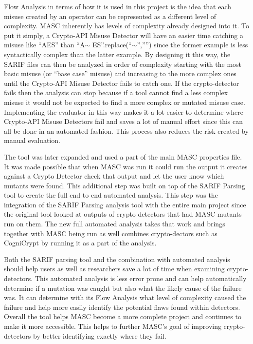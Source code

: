 Flow Analysis in terms of how it is used in this project is the idea that each misuse created by an operator can be represented as a different level of complexity.  MASC inherently has levels of complexity already designed into it. To put it simply, a Crypto-API Misuse Detector will have an easier time catching a misuse like “AES” than “A$\sim$ ES”.replace(“$\sim$”,””) since the former example is less syntactically complex than the latter example. By designing it this way, the SARIF files can then be analyzed in order of complexity starting with the most basic misuse (or “base case” misuse) and increasing to the more complex ones until the Crypto-API Misuse Detector fails to catch one. If the crypto-detector fails then the analysis can stop because if a tool cannot find a less complex misuse it would not be expected to find a more complex or mutated misuse case.  Implementing the evaluator in this way makes it a lot easier to determine where Crypto-API Misuse Detectors fail and saves a lot of manual effort since this can all be done in an automated fashion.  This process also reduces the risk created by manual evaluation. 

The tool was later expanded and used a part of the main MASC properties file. It was made possible that when MASC was run it could run the output it creates against a Crypto Detector check that output and let the user know which mutants were found. This additional step was built on top of the SARIF Parsing tool to create the full end to end automated analysis. This step was the integration of the SARIF Parsing analysis tool with the entire main project since the original tool looked at outputs of crypto detectors that had MASC mutants run on them. The new full automated analysis takes that work and brings together with MASC being run as well combines crypto-dectors such as CogniCrypt by running it as a part of the analysis.

Both the SARIF parsing tool and the combination with automated analysis should help users as well as researchers save a lot of time when examining crypto-detectors. This automated analysis is less error prone and can help automatically determine if a mutation was caught but also what the likely cause of the failure was. It can determine with its Flow Analysis what level of complexity caused the failure and help more easily identify the potential flaws found within detectors. Overall the tool helps MASC become a more complete project and continues to make it more accessible. This helps to further MASC’s goal of improving crypto-detectors by better identifying exactly where they fail. 

